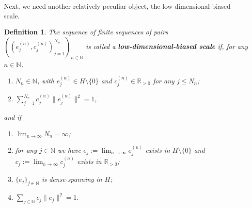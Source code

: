 \documentclass[10pt,a4paper]{amsart}
\newtheorem{defn}[thm]{Definition}
\newcounter{pointnumber}
\begin{document}
Next, we need another relatively peculiar object, the low-dimensional-biased scale.
\begin{defn}\label{definition_scale}
	The sequence of finite sequences of pairs $((e_j^{(n)},c_j^{(n)})_{j=1}^{N_n})_{n\in\mathbb{N}}$ is called a \textbf{low-dimensional-biased scale} if, for any $n\in\mathbb{N}$,
	\begin{enumerate}
		\setcounter{enumi}{\value{pointnumber}}
		\item\label{property_scale_elements} $N_n\in\mathbb{N}$, with $e_j^{(n)}\in H\setminus\{0\}$ and $c_j^{(n)}\in\mathbb{R}_{>0}$ for any $j\leq N_n$;
		\item\label{property_scale_proba} $\sum_{j=1}^{N_n}c_j^{(n)}\|e_j^{(n)}\|^2=1$,
		\setcounter{pointnumber}{\value{enumi}}
	\end{enumerate}
	and if
	\begin{enumerate}
		\setcounter{enumi}{\value{pointnumber}}
		\item\label{property_scale_infinity} $\lim_{n\rightarrow\infty}N_n=\infty$;
		\item\label{property_scale_limits}  for any $j\in\mathbb{N}$ we have $e_j:=\lim_{n\rightarrow\infty} e_j^{(n)}$ exists in $H\setminus\{0\}$ and $c_j:=\lim_{n\rightarrow\infty}c_j^{(n)}$ exists in $\mathbb{R}_{>0}$;
		\item\label{property_scale_dense} $\{e_j\}_{j\in\mathbb{N}}$ is dense-spanning in $H$;
		\item\label{property_scale_bias} $\sum_{j\in\mathbb{N}}c_j\|e_j\|^2=1.$
		\setcounter{pointnumber}{\value{enumi}}
	\end{enumerate}
\end{defn}
\end{document}
